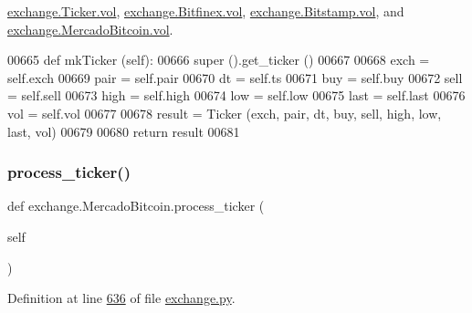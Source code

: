 \hyperlink{exchange_8py_source_l00065}{exchange.\+Ticker.\+vol}, \hyperlink{exchange_8py_source_l00435}{exchange.\+Bitfinex.\+vol}, \hyperlink{exchange_8py_source_l00507}{exchange.\+Bitstamp.\+vol}, and \hyperlink{exchange_8py_source_l00647}{exchange.\+Mercado\+Bitcoin.\+vol}.


\begin{DoxyCode}
00665     \textcolor{keyword}{def }mkTicker (self):
00666         super ().get\_ticker ()
00667         
00668         exch = self.exch
00669         pair = self.pair
00670         dt   = self.ts
00671         buy  = self.buy
00672         sell = self.sell
00673         high = self.high
00674         low  = self.low
00675         last = self.last
00676         vol  = self.vol
00677         
00678         result = Ticker (exch, pair, dt, buy, sell, high, low, last, vol)
00679         
00680         \textcolor{keywordflow}{return} result
00681     
\end{DoxyCode}
\mbox{\label{classexchange_1_1_mercado_bitcoin_a2acc4c0710269e72bc9547508be97117}} 
\subsubsection{\texorpdfstring{process\+\_\+ticker()}{process\_ticker()}}
{\footnotesize\ttfamily def exchange.\+Mercado\+Bitcoin.\+process\+\_\+ticker (\begin{DoxyParamCaption}\item[{}]{self }\end{DoxyParamCaption})}



Definition at line \hyperlink{exchange_8py_source_l00636}{636} of file \hyperlink{exchange_8py_source}{exchange.\+py}.


